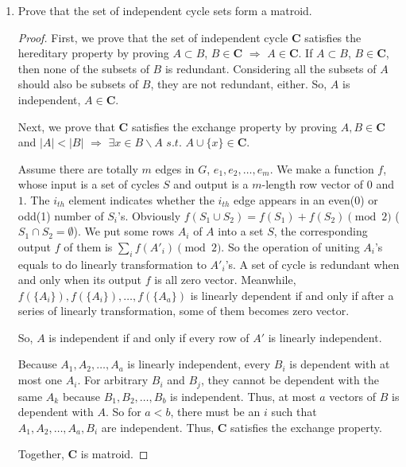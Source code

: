 \documentclass[12pt,a4paper]{article}
\theoremstyle{definition}
\begin{document}
\begin{enumerate}
\begin{enumerate}
\begin{proof}
    \end{proof}

\item Prove that the set of independent cycle sets form a matroid.

\begin{proof}\quad\par
    First, we prove that the set of independent cycle $\mathbf{C}$ satisfies the hereditary property by proving $A\subset B$, $B\in \mathbf{C}$ $\Rightarrow$ $A\in\mathbf{C}$. If $A\subset B$, $B\in \mathbf{C}$, then none of the subsets of $B$ is redundant. Considering all the subsets of $A$ should also be subsets of $B$, they are not redundant, either. So, $A$ is independent, $A\in \mathbf{C}$.

    Next, we prove that $\mathbf{C}$ satisfies the exchange property by proving $A,B\in\mathbf{C}$ and $|A|<|B|$ $\Rightarrow$ $\exists x\in B\backslash A$ $s.t.$ $A\cup\{x\}\in\mathbf{C}$.

    Assume there are totally $m$ edges in $G$, $e_1, e_2,\dots,e_m$. We make a function $f$, whose input is a set of cycles $S$ and output is a $m$-length row vector of $0$ and $1$. The $i_{th}$ element indicates whether the $i_{th}$ edge appears in an even(0) or odd(1) number of $S_i$'s. Obviously $f(S_1\cup S_2)=f(S_1)+f(S_2)\pmod{2}$ ($S_1\cap S_2=\emptyset$). We put some rows $A_i$ of $A$ into a set $S$, the corresponding output $f$ of them is $\sum_{i}f(A'_i)\pmod{2}$. So the operation of uniting $A_i$'s equals to do linearly transformation to $A'_i$'s. A set of cycle is redundant when and only when its output $f$ is all zero vector. Meanwhile, $f(\{A_i\}),f(\{A_i\}),\dots,f(\{A_a\})$ is linearly dependent if and only if after a series of linearly transformation, some of them becomes zero vector.

    So, $A$ is independent if and only if every row of $A'$ is linearly independent.

    Because $A_1,A_2,\dots,A_a$ is linearly independent, every $B_i$ is dependent with at most one $A_i$. For arbitrary $B_i$ and $B_j$, they cannot be dependent with the same $A_k$ because $B_1,B_2,\dots,B_b$ is independent. Thus, at most $a$ vectors of $B$ is dependent with $A$. So for $a<b$, there must be an $i$ such that $A_1,A_2,\dots,A_a,B_i$ are independent. Thus, $\mathbf{C}$ satisfies the exchange property.

    Together, $\mathbf{C}$ is matroid.

\end{proof}


\end{enumerate}
\end{enumerate}
\end{document}
